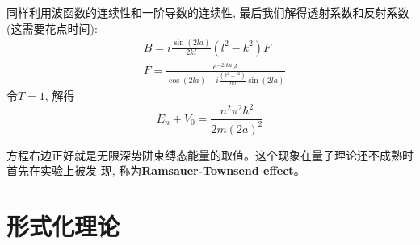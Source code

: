 \documentclass[a4paper,zihao=-4,linespread=1]{ctexrep}
\begin{document}
    同样利用波函数的连续性和一阶导数的连续性, 最后我们解得透射系数和反射系数(这需要花点时间):
    \begin{equation}
        \begin{aligned}
        &B=i \frac{\sin (2 l a)}{2 k l}\left(l^{2}-k^{2}\right) F \\
        &F=\frac{e^{-2 i k a} A}{\cos (2 l a)-i \frac{\left(k^{2}+l^{2}\right)}{2 k l} \sin (2 l a)}
        \end{aligned}
    \end{equation}
    令$T=1$, 解得$$E_n+V_0=\frac{n^2\pi^2\hbar^2}{2m(2a)^2}$$
    
    方程右边正好就是无限深势阱束缚态能量的取值。这个现象在量子理论还不成熟时首先在实验上被发
    现, 称为\textbf{Ramsauer-Townsend effect}。
    
    \chapter{形式化理论}
    
\end{document}
